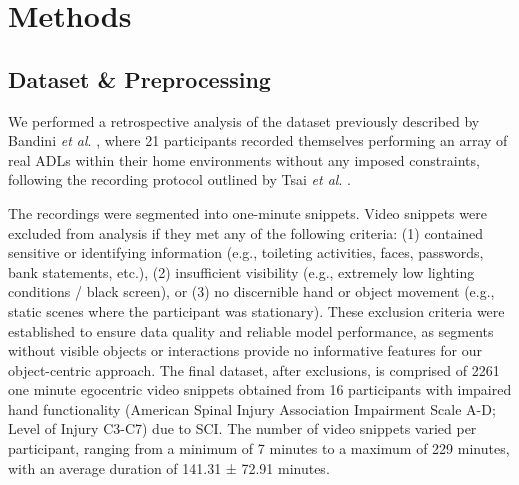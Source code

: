 \documentclass[journal,twoside,web]{ieeecolor}
\begin{document}
\section{Methods}
\subsection{Dataset \& Preprocessing}

We performed a retrospective analysis of the dataset previously described by Bandini \textit{et al}. \cite{Bandini2022-rs}, where 21 participants recorded themselves performing an array of real ADLs within their home environments without any imposed constraints, following the recording protocol outlined by Tsai \textit{et al}. \cite{Tsai2020-up}.

The recordings were segmented into one-minute snippets. Video snippets were excluded from analysis if they met any of the following criteria: (1) contained sensitive or identifying information (e.g., toileting activities, faces, passwords, bank statements, etc.), (2) insufficient visibility (e.g., extremely low lighting conditions / black screen), or (3) no discernible hand or object movement (e.g., static scenes where the participant was stationary). These exclusion criteria were established to ensure data quality and reliable model performance, as segments without visible objects or interactions provide no informative features for our object-centric approach. The final dataset, after exclusions, is comprised of 2261 one minute egocentric video snippets obtained from 16 participants with impaired hand functionality (American Spinal Injury Association Impairment Scale A-D; Level of Injury C3-C7) due to SCI. The number of video snippets varied per participant, ranging from a minimum of 7 minutes to a maximum of 229 minutes, with an average duration of 141.31 ± 72.91 minutes.
\end{document}
